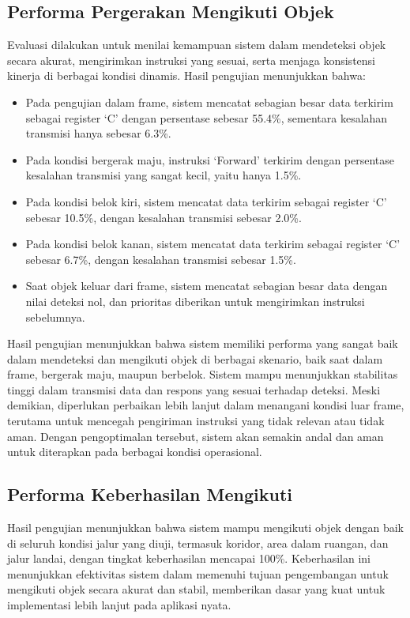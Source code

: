 \subsection{Performa Pergerakan Mengikuti Objek}
\label{sec:akurasiikutiobjek}

Evaluasi dilakukan untuk menilai kemampuan sistem dalam mendeteksi objek secara akurat, mengirimkan instruksi yang sesuai, serta menjaga konsistensi kinerja di berbagai kondisi dinamis. Hasil pengujian menunjukkan bahwa:

\begin{itemize}
    \item Pada pengujian dalam frame, sistem mencatat sebagian besar data terkirim sebagai register ‘C’ dengan persentase sebesar 55.4\%, sementara kesalahan transmisi hanya sebesar 6.3\%.
    \item Pada kondisi bergerak maju, instruksi ‘Forward’ terkirim dengan persentase kesalahan transmisi yang sangat kecil, yaitu hanya 1.5\%.
    \item Pada kondisi belok kiri, sistem mencatat data terkirim sebagai register ‘C’ sebesar 10.5\%, dengan kesalahan transmisi sebesar 2.0\%.
    \item Pada kondisi belok kanan, sistem mencatat data terkirim sebagai register ‘C’ sebesar 6.7\%, dengan kesalahan transmisi sebesar 1.5\%.
    \item Saat objek keluar dari frame, sistem mencatat sebagian besar data dengan nilai deteksi nol, dan prioritas diberikan untuk mengirimkan instruksi sebelumnya.
\end{itemize}

Hasil pengujian menunjukkan bahwa sistem memiliki performa yang sangat baik dalam mendeteksi dan mengikuti objek di berbagai skenario, baik saat dalam frame, bergerak maju, maupun berbelok. Sistem mampu menunjukkan stabilitas tinggi dalam transmisi data dan respons yang sesuai terhadap deteksi. Meski demikian, diperlukan perbaikan lebih lanjut dalam menangani kondisi luar frame, terutama untuk mencegah pengiriman instruksi yang tidak relevan atau tidak aman. Dengan pengoptimalan tersebut, sistem akan semakin andal dan aman untuk diterapkan pada berbagai kondisi operasional.

\subsection{Performa Keberhasilan Mengikuti}
\label{sec:keberhasilanmengikuti}

Hasil pengujian menunjukkan bahwa sistem mampu mengikuti objek dengan baik di seluruh kondisi jalur yang diuji, termasuk koridor, area dalam ruangan, dan jalur landai, dengan tingkat keberhasilan mencapai 100\%. Keberhasilan ini menunjukkan efektivitas sistem dalam memenuhi tujuan pengembangan untuk mengikuti objek secara akurat dan stabil, memberikan dasar yang kuat untuk implementasi lebih lanjut pada aplikasi nyata.